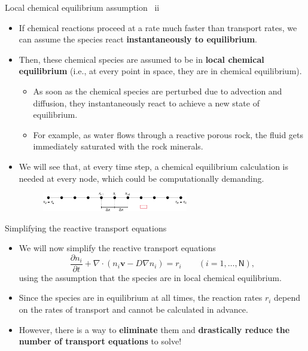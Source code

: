 %
%
\begin{frame}{Local chemical equilibrium assumption \, ii}
\begin{itemize}
\item If chemical reactions proceed at a rate much faster than transport
rates, we can assume the species react \textbf{instantaneously to
equilibrium}.
\pause
\item Then, these chemical species are assumed to be in \alert{\bf local chemical equilibrium}
(i.e., at every point in space, they are in chemical equilibrium).
\begin{itemize}
\item As soon as the chemical species are perturbed due to advection and
diffusion, they instantaneously react to achieve a new state of equilibrium.
\item For example, as water flows through a reactive porous rock, the fluid gets immediately saturated with the rock minerals.
\end{itemize}
\pause
\item We will see that, at every time step, {a chemical equilibrium calculation	is needed at every node}, which could be computationally demanding.
%
\vskip 20pt
\begin{figure}
\centering{}\includegraphics[width=0.6\textwidth]{figures/reactive-transport//finite-difference-domain-discretization}
\end{figure}
\end{itemize}
\end{frame}
%
%
\begin{frame}[<+->]{Simplifying the reactive transport equations}
\begin{itemize}
\item We will now simplify the reactive transport equations
\[
\frac{\partial n_{i}}{\partial t}+\nabla\cdot(n_{i}\boldsymbol{v}-D\nabla n_{i})=r_{i}\qquad(i=1,\ldots,\mathsf{N}),
\]
using the assumption that the species are in \alert{local chemical equilibrium}. 
\item Since the species are in equilibrium at all times, the reaction rates
$r_{i}$ \alert{depend on the rates of transport} and \alert{cannot be calculated in advance}.
\item However, there is a way to \textbf{eliminate} them and \textbf{drastically
reduce the number of transport equations} to solve!
\end{itemize}
\end{frame}
